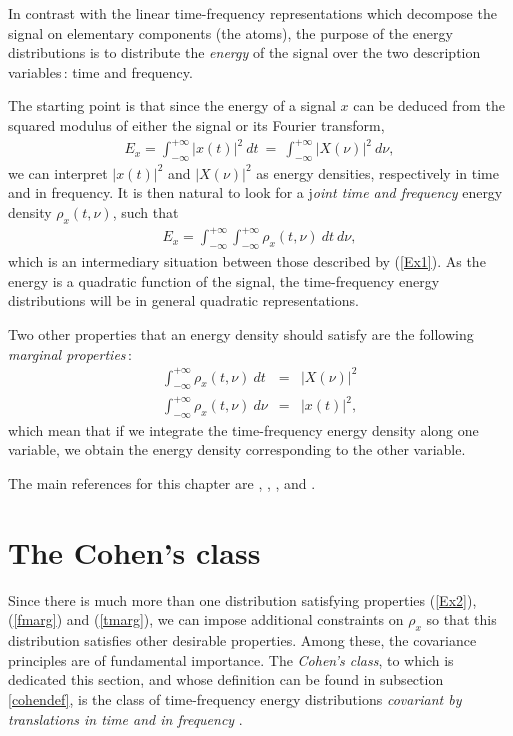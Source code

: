 
In contrast with the linear time-frequency representations which
decompose the signal on elementary components (the atoms), the purpose of
the energy distributions is to distribute the {\it energy} of the signal
over the two description variables\,: time and frequency.

  The starting point is that since the energy of a signal $x$ can be deduced
from the squared modulus of either the signal or its Fourier transform,
\begin{eqnarray}
\label{Ex1}
E_x = \int_{-\infty}^{+\infty} |x(t)|^2\ dt\ =\ \int_{-\infty}^{+\infty}
|X(\nu)|^2\ d\nu,  
\end{eqnarray}
we can interpret $|x(t)|^2$ and $|X(\nu)|^2$ as energy densities, respectively
in time and in frequency. It is then natural to look for a j{\it oint time and
frequency} energy density $\rho_x(t,\nu)$, such that
\begin{eqnarray}
\label{Ex2}
E_x = \int_{-\infty}^{+\infty} \int_{-\infty}^{+\infty} \rho_x(t,\nu)\ dt\
d\nu,               
\end{eqnarray}
which is an intermediary situation between those described by
(\ref{Ex1}). As the energy is a quadratic function of the signal, the
time-frequency energy distributions will be in general quadratic
representations.

Two other properties that an energy density should satisfy are the
following {\it marginal properties}\,:\index{marginal properties}
\begin{eqnarray}
\label{fmarg}
\int_{-\infty}^{+\infty} \rho_x(t,\nu)\ dt   &=& |X(\nu)|^2\\
\label{tmarg}
\int_{-\infty}^{+\infty} \rho_x(t,\nu)\ d\nu &=& |x(t) |^2,
\end{eqnarray}
which mean that if we integrate the time-frequency energy density along one
variable, we obtain the energy density corresponding to the other variable.

The main references for this chapter are \cite{FLA93}, \cite{COH89},
\cite{AUG91}, \cite{HLA91} and \cite{HLA92}.


\section{The Cohen's class}
\label{cohenclass}
Since there is much more than one distribution satisfying properties
(\ref{Ex2}), (\ref{fmarg}) and (\ref{tmarg}), we can impose additional
constraints on $\rho_x$ so that this distribution satisfies other desirable
properties. Among these, the covariance principles are of fundamental
importance. The {\it Cohen's class}, to which is dedicated this section,
and whose definition can be found in subsection \ref{cohendef}, is the
class of time-frequency energy distributions {\it covariant by translations
in time and in frequency} \cite{COH89}.

